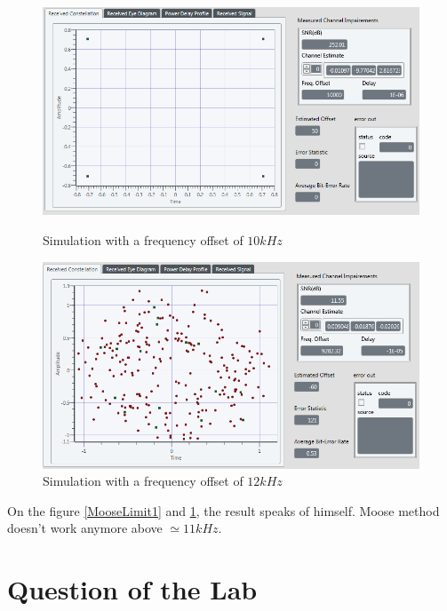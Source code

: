 \documentclass[frenchb, oneside, headings=normal]{scrartcl}
\begin{document}
\begin{figure}[!ht]
    \begin{minipage}[b]{0.48\linewidth}
        \centering \includegraphics[scale=0.45]{img/test_Offset_10k_OK_limitMooseCheck.png}
     \caption{Simulation with a frequency offset of $10 kHz$}
     \label{MooseLimit1}
    \end{minipage}\hfill
    \begin{minipage}[b]{0.48\linewidth}
         \centering \includegraphics[scale=0.45]{img/test_Offset_12k_OK_limitMooseCheck.png}
\caption{Simulation with a frequency offset of $12 kHz$}
 \label{MooseLimit2}
    \end{minipage}
\end{figure}

On the figure \ref{MooseLimit1} and \ref{MooseLimit2}, the result speaks of himself. Moose method doesn't work anymore above $\simeq 11 kHz$.

\section{Question of the Lab}
\end{document}
